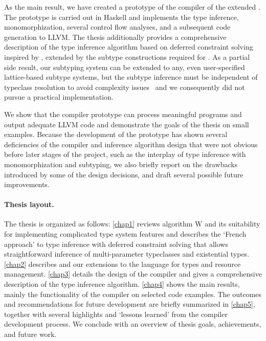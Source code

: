 As the main result, we have created a prototype of the compiler of the extended \cmm. The prototype is carried out in Haskell and implements the type inference, monomorphization, several control flow analyses, and a subsequent code generation to LLVM. The thesis additionally provides a comprehensive description of the type inference algorithm based on deferred constraint solving inspired by \citet{vytiniotis2011outsidein}, extended by the subtype constructions required for \cmm. As a partial side result, our subtyping system can be extended to any, even user-specified lattice-based subtype systems, but the subtype inference must be independent of typeclass resolution to avoid complexity issues~\cite{tiuryn1992subtype,frey1997subtype} and we consequently did not pursue a practical implementation.

We show that the compiler prototype can process meaningful programs and output adequate LLVM code and demonstrate the goals of the thesis on small examples. Because the development of the prototype has shown several deficiencies of the compiler and inference algorithm design that were not obvious before later stages of the project, such as the interplay of type inference with monomorphization and subtyping, we also briefly report on the drawbacks introduced by some of the design decisions, and draft several possible future improvements.

\paragraph{Thesis layout.}
The thesis is organized as follows:
\cref{chap1} reviews algorithm W and its suitability for implementing complicated type system features and describes the `French approach' to type inference with deferred constraint solving that allows straightforward inference of multi-parameter typeclasses and existential types.
\cref{chap2} describes \cmm and our extensions to the language for types and resource management.
\cref{chap3} details the design of the compiler and gives a comprehensive description of the type inference algorithm.
\cref{chap4} shows the main results, mainly the functionality of the compiler on selected code examples.
The outcomes and recommendations for future development are briefly summarized in \cref{chap5}, together with several highlights and `lessons learned' from the compiler development process.
We conclude with an overview of thesis goals, achievements, and future work.

